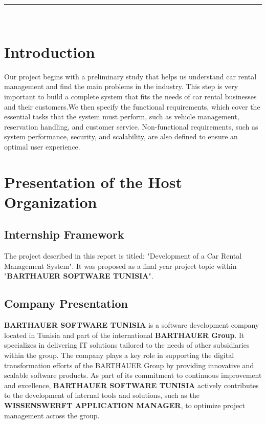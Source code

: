 \begin{center}
\rule[0.5ex]{1\columnwidth}{1pt}\\[0.5cm]
\end{center}

\newpage

\section{Introduction}
Our project begins with a preliminary study that helps us understand car rental management and find the main problems in the industry. This step is very important to build a complete system that fits the needs of car rental businesses and their customers.We then specify the functional requirements, which cover the essential tasks that the system must perform, such as vehicle management, reservation handling, and customer service. Non-functional requirements, such as system performance, security, and scalability, are also defined to ensure an optimal user experience.

\section{Presentation of the Host Organization}
\subsection{Internship Framework}
The project described in this report is titled: "Development of a Car Rental Management System". It was proposed as a final year project topic within "\textbf{BARTHAUER SOFTWARE TUNISIA}".

\subsection{Company Presentation}
\textbf{BARTHAUER SOFTWARE TUNISIA} is a software development company located in Tunisia and part of the international \textbf{BARTHAUER Group}. It specializes in delivering IT solutions tailored to the needs of other subsidiaries within the group. The company plays a key role in supporting the digital transformation efforts of the BARTHAUER Group by providing innovative and scalable software products. As part of its commitment to continuous improvement and excellence, \textbf{BARTHAUER SOFTWARE TUNISIA} actively contributes to the development of internal tools and solutions, such as the \textbf{WISSENSWERFT APPLICATION MANAGER}, to optimize project management across the group. 

